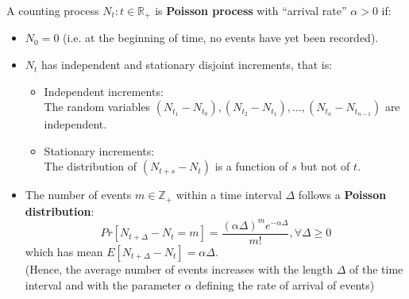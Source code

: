 \begin{definition}
    A counting process $N_t: t \in \mathbb{R}_+$ is \textbf{Poisson process} with ``arrival rate'' $\alpha > 0$ if: \begin{itemize}
        \item $N_0 = 0$ (i.e. at the beginning of time, no events have yet been recorded).
        \item $N_t$ has independent and stationary disjoint increments, that is: \begin{itemize}
                  \item Independent increments:\\The random variables $(N_{t_1} - N_{t_0}), (N_{t_2} - N_{t_1}), \dots, (N_{t_n} - N_{t_{n-1}})$ are independent.
                  \item Stationary increments:\\The distribution of $(N_{t+s}-N_t)$ is a function of $s$ but not of $t$.
              \end{itemize}
        \item The number of events $m \in \mathbb{Z}_+$ within a time interval $\Delta$ follows a \textbf{Poisson distribution}: \[
                  Pr[N_{t+\Delta} - N_t = m] = \frac{(\alpha\Delta)^m e^{-\alpha\Delta}}{m!}, \forall \Delta \geq 0
              \] which has mean $E[N_{t+\Delta} - N_t] = \alpha \Delta$.\\
              (Hence, the average number of events increases with the length $\Delta$ of the time interval and with the parameter $\alpha$ defining the rate of arrival of events)
    \end{itemize}
\end{definition}

